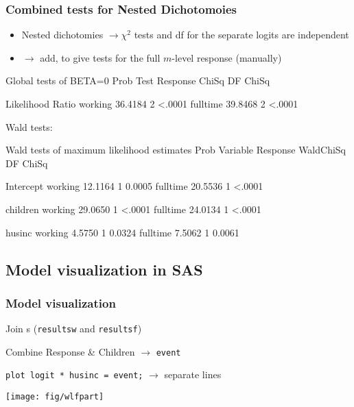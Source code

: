 \begin{frame}[fragile]
  \frametitle{Combined tests for Nested Dichotomoies}
  \begin{itemize}
	\item Nested dichotomies $\rightarrow \chi^2$ tests and df for the
	separate logits are independent
	\item $\rightarrow$ add, to give tests for the full $m$-level response (\alert{manually})
  \end{itemize}
 
\begin{Output}[gobble=3,fontsize=\footnotesize,baselinestretch=0.7]
                       Global tests of BETA=0
                                                            Prob
    Test                Response         ChiSq      DF     ChiSq

    Likelihood Ratio    working        36.4184       2    <.0001
                        fulltime       39.8468       2    <.0001
\end{Output}
Wald tests:
\begin{Output}[gobble=3,fontsize=\footnotesize,baselinestretch=0.7]
             Wald tests of maximum likelihood estimates
                                                       Prob
        Variable     Response     WaldChiSq    DF     ChiSq

        Intercept    working        12.1164    1     0.0005
                     fulltime       20.5536    1     <.0001

        children     working        29.0650    1     <.0001
                     fulltime       24.0134    1     <.0001

        husinc       working         4.5750    1     0.0324
                     fulltime        7.5062    1     0.0061
\end{Output}
\end{frame}

\subsection{Model visualization in SAS}
\begin{frame}
  \frametitle{Model visualization}
  \begin{itemize*}
	\item Join \ODS{}s (\texttt{resultsw} and \texttt{resultsf})
	\item Combine Response \& Children $\rightarrow$ \texttt{event}
	\item \texttt{plot logit * husinc = event;} $\rightarrow$ separate lines
  \end{itemize*}
\begin{center}
  \texttt{[image: fig/wlfpart]}
\end{center}
\end{frame}

